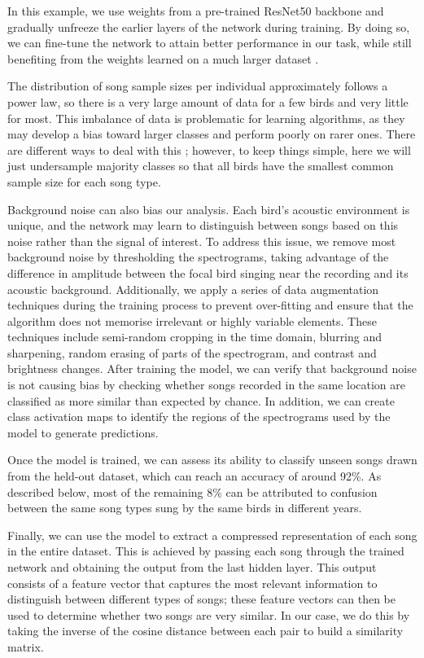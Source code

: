 In this example, we use weights from a pre-trained ResNet50 backbone \parencite{he2015} and gradually unfreeze the earlier layers of the network during training. By doing so, we can fine-tune the network to attain better performance in our task, while still benefiting from the weights learned on a much larger dataset \parencite{zhuang2021}. 

The distribution of song sample sizes per individual approximately follows a
power law, so there is a very large amount of data for a few birds and very
little for most. This imbalance of data is problematic for learning algorithms, as they may develop a bias toward larger classes and perform poorly on rarer ones. There are different ways to deal with this \parencite[see, e.g.,][]{krawczyk2016, thabtah2020}; however, to keep things simple, here we will just undersample majority classes so that all birds have the smallest common sample size for each song type.

Background noise can also bias our analysis. Each bird's acoustic environment is unique, and the network may learn to distinguish between songs based on this noise rather than the signal of interest. To address this issue, we remove most background noise by thresholding the spectrograms, taking advantage of the difference in amplitude between the focal bird singing near the recording and its acoustic background. Additionally, we apply a series of data augmentation techniques during the training process to prevent over-fitting and ensure that the algorithm does not memorise irrelevant or highly variable elements. These techniques include semi-random cropping in the time domain, blurring and sharpening, random erasing of parts of the spectrogram, and contrast and brightness changes. After training the model, we can verify that background noise is not causing bias by checking whether songs recorded in the same location are classified as more similar than expected by chance. In addition, we can create class activation maps to identify the regions of the spectrograms used by the model to generate predictions.

Once the model is trained, we can assess its ability to classify unseen songs drawn from the held-out dataset, which can reach an accuracy of around 92\%. As described below, most of the remaining 8\% can be attributed to confusion between the same song types sung by the same birds in different years. 

Finally, we can use the model to extract a compressed representation of each song in the entire dataset. This is achieved by passing each song through the trained network and obtaining the output from the last hidden layer. This output consists of a feature vector that captures the most relevant information to distinguish between different types of songs; these feature vectors can then be used to determine whether two songs are very similar. In our case, we do this by taking the inverse of the cosine distance between each pair to build a similarity matrix.

